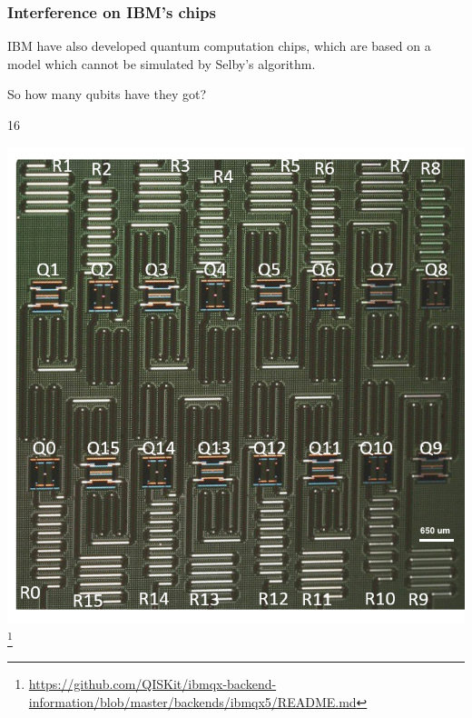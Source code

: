 \documentclass[notes]{beamer}
\begin{document}

\begin{frame}
\frametitle{Interference on IBM's chips}

IBM have also developed quantum computation chips, which are based on a model which cannot be simulated by Selby's algorithm.

So how many qubits have they got?
\end{frame}

\begin{frame}
\begin{center}
\begin{huge}
16
\end{huge}

\includegraphics[scale=0.3]{ibmqx3-labeled}\footnote{\url{https://github.com/QISKit/ibmqx-backend-information/blob/master/backends/ibmqx5/README.md}}
\end{center}
\end{frame}

\end{document}
